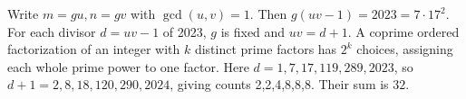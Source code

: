 Write $m=gu,n=gv$ with $\gcd(u,v)=1$. Then $g(uv-1)=2023=7\cdot17^2$. For each divisor $d=uv-1$ of 2023, $g$ is fixed and $uv=d+1$. A coprime ordered factorization of an integer with $k$ distinct prime factors has $2^k$ choices, assigning each whole prime power to one factor. Here $d=1,7,17,119,289,2023$, so $d+1=2,8,18,120,290,2024$, giving counts 2,2,4,8,8,8. Their sum is $\boxed{32}$.
